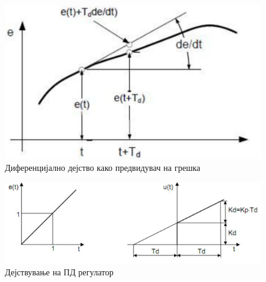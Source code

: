 \documentclass{article}
\begin{document}
\begin{figure}[H]
\includegraphics[width=0.3\linewidth]{el_8.png}
\centering
\caption{Диференцијално дејство како предвидувач на грешка}
\label{fig:el_8.png}
\end{figure}

\begin{figure}[H]
\includegraphics[width=0.3\linewidth]{el_9.png}
\centering
\caption{Дејствување на ПД регулатор}
\label{fig:el_9.png}
\end{figure}










\end{document}
